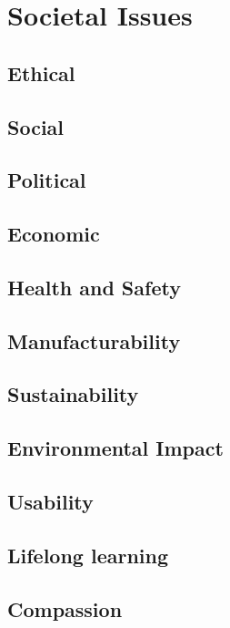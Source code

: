 \chapter{Societal Issues}

\section{Ethical}

\section{Social}

\section{Political}

\section{Economic}

\section{Health and Safety}

\section{Manufacturability}

\section{Sustainability}

\section{Environmental Impact}

\section{Usability}

\section{Lifelong learning}

\section{Compassion}